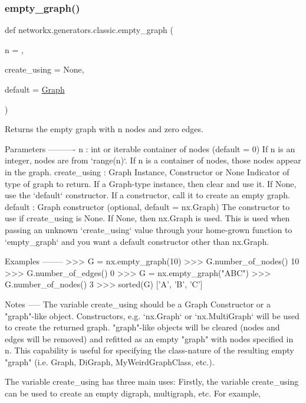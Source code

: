 \subsubsection{\texorpdfstring{empty\+\_\+graph()}{empty\_graph()}}
{\footnotesize\ttfamily def networkx.\+generators.\+classic.\+empty\+\_\+graph (\begin{DoxyParamCaption}\item[{}]{n = {},  }\item[{}]{create\+\_\+using = {\ttfamily None},  }\item[{}]{default = {\ttfamily \hyperlink{classnetworkx_1_1classes_1_1graph_1_1Graph}{Graph}} }\end{DoxyParamCaption})}

\begin{DoxyVerb}Returns the empty graph with n nodes and zero edges.

Parameters
----------
n : int or iterable container of nodes (default = 0)
    If n is an integer, nodes are from `range(n)`.
    If n is a container of nodes, those nodes appear in the graph.
create_using : Graph Instance, Constructor or None
    Indicator of type of graph to return.
    If a Graph-type instance, then clear and use it.
    If None, use the `default` constructor.
    If a constructor, call it to create an empty graph.
default : Graph constructor (optional, default = nx.Graph)
    The constructor to use if create_using is None.
    If None, then nx.Graph is used.
    This is used when passing an unknown `create_using` value
    through your home-grown function to `empty_graph` and
    you want a default constructor other than nx.Graph.

Examples
--------
>>> G = nx.empty_graph(10)
>>> G.number_of_nodes()
10
>>> G.number_of_edges()
0
>>> G = nx.empty_graph("ABC")
>>> G.number_of_nodes()
3
>>> sorted(G)
['A', 'B', 'C']

Notes
-----
The variable create_using should be a Graph Constructor or a
"graph"-like object. Constructors, e.g. `nx.Graph` or `nx.MultiGraph`
will be used to create the returned graph. "graph"-like objects
will be cleared (nodes and edges will be removed) and refitted as
an empty "graph" with nodes specified in n. This capability
is useful for specifying the class-nature of the resulting empty
"graph" (i.e. Graph, DiGraph, MyWeirdGraphClass, etc.).

The variable create_using has three main uses:
Firstly, the variable create_using can be used to create an
empty digraph, multigraph, etc.  For example,


\end{DoxyVerb}
